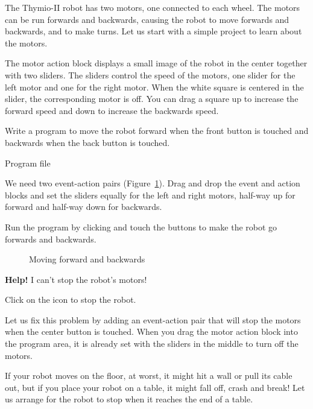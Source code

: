 \label{c.moving}


The Thymio-II robot has two motors, one connected to each wheel. The
motors can be run forwards and backwards, causing the robot to move
forwards and backwards, and to make turns. Let us start with a simple
project to learn about the motors.

The motor action block  displays a small image of the
robot in the center together with two sliders. The sliders control the
speed of the motors, one slider for the left motor and one for the right
motor. When the white square is centered in the slider, the
corresponding motor is off. You can drag a square up to increase the
forward speed and down to increase the backwards speed.

Write a program to move the robot forward when the front button
is touched and backwards when the back button is touched.

{\raggedleft \hfill Program file }

We need two event-action pairs (Figure~\ref{fig.nostop}). Drag and drop
the event and action blocks and set the sliders equally for the left and
right motors, half-way up for forward and half-way down for backwards.

Run the program by clicking  and touch the buttons to
make the robot go forwards and backwards.

\begin{figure}
\begin{center}
\caption{Moving forward and backwards}\label{fig.nostop}
\end{center}
\end{figure}


\textbf{Help!} I can't stop the robot's motors!

Click on the icon  to stop the robot.

Let us fix this problem by adding an event-action pair 
that will stop the motors when the center button is touched. When you
drag the motor action block into the program area, it is already set
with the sliders in the middle to turn off the motors.


If your robot moves on the floor, at worst, it might hit a wall or pull
its cable out, but if you place your robot on a table, it might fall
off, crash and break! Let us arrange for the robot to stop when it
reaches the end of a table.

